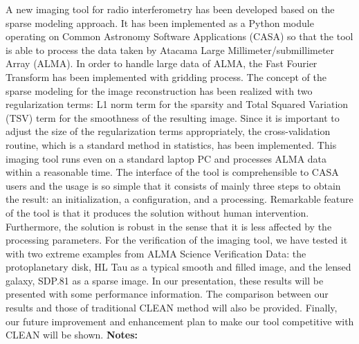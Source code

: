 \documentclass{report}
\begin{document}
{{{{{{{{{{{{{{{{{{{{{{{{{{{{{{{{{{{{{{{{{{{{{{{{{{{{{{{{{{{{{{{{{{{{{{{{{{{{{{{{{{{{{{{{{{{{{{{{{{{{{{{{{{{{{{{{{{{{{{{{{{{{{{{{A new imaging tool for radio interferometry has been developed based on the sparse modeling approach. It has been implemented as a Python module operating on Common Astronomy Software Applications (CASA) so that the tool is able to process the data taken by Atacama Large Millimeter/submillimeter Array (ALMA). In order to handle large data of ALMA, the Fast Fourier Transform has been implemented with gridding process. The concept of the sparse modeling for the image reconstruction has been realized with two regularization terms: L1 norm term for the sparsity and Total Squared Variation (TSV) term for the smoothness of the resulting image. Since it is important to adjust the size of the regularization terms appropriately, the cross-validation routine, which is a standard method in statistics, has been implemented. This imaging tool runs even on a standard laptop PC and processes ALMA data within a reasonable time. The interface of the tool is comprehensible to CASA users and the usage is so simple that it consists of mainly three steps to obtain the result: an initialization, a configuration, and a processing. Remarkable feature of the tool is that it produces the solution without human intervention. Furthermore, the solution is robust in the sense that it is less affected by the processing parameters. For the verification of the imaging tool, we have tested it with two extreme examples from ALMA Science Verification Data: the protoplanetary disk, HL Tau as a typical smooth and filled image, and the lensed galaxy, SDP.81 as a sparse image. In our presentation, these results will be presented with some performance information. The comparison between our results and those of traditional CLEAN method will also be provided. Finally, our future improvement and enhancement plan to make our tool competitive with CLEAN will be shown.\newline
{\bf Notes:}\newline
{\newpage
}}}}}}}}}}}}}}}}}}}}}}}}}}}}}}}}}}}}}}}}}}}}}}}}}}}}}}}}}}}}}}}}}}}}}}}}}}}}}}}}}}}}}}}}}}}}}}}}}}}}}}}}}}}}}}}}}}}}}}}}}}}}}}}}}
\end{document}
